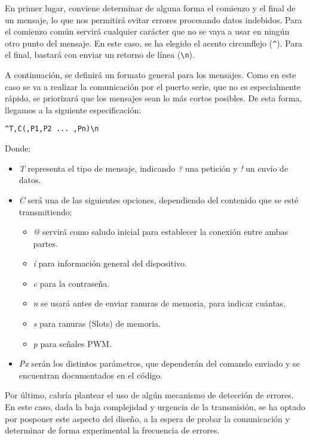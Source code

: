 En primer lugar, conviene determinar de alguna forma el comienzo y el final de un mensaje, lo que nos permitirá evitar errores procesando datos indebidos. Para el comienzo común servirá cualquier carácter que no se vaya a usar en ningún otro punto del mensaje. En este caso, se ha elegido el acento circunflejo (\verb|^|). Para el final, bastará con enviar un retorno de línea (\verb|\n|).

A continuación, se definirá un formato general para los mensajes. Como en este caso se va a realizar la comunicación por el puerto serie, que no es especialmente rápido, se priorizará que los mensajes sean lo más cortos posibles. De esta forma, llegamos a la siguiente especificación:

\begin{center}
    {\selectfont\verb|^T,C(,P1,P2 ... ,Pn)\n|}
\end{center}

Donde:

\begin{itemize}
    \item\textit{T} representa el tipo de mensaje, indicando \textit{?} una petición y \textit{!} un envío de datos.
    \item\textit{C} será una de las siguientes opciones, dependiendo del contenido que se esté transmitiendo:
        \begin{itemize}
            \item\textit{@} servirá como saludo inicial para establecer la conexión entre ambas partes.
            \item\textit{i} para información general del dispositivo.
            \item\textit{c} para la contraseña.
            \item\textit{n} se usará antes de enviar ranuras de memoria, para indicar cuántas.
            \item\textit{s} para ranuras (Slots) de memoria.
            \item\textit{p} para señales PWM.
        \end{itemize}
    \item\textit{Px} serán los distintos parámetros, que dependerán del comando enviado y se encuentran documentados en el código.
\end{itemize}

Por último, cabría plantear el uso de algún mecanismo de detección de errores. En este caso, dada la baja complejidad y urgencia de la transmisión, se ha optado por posponer este aspecto del diseño, a la espera de probar la comunicación y determinar de forma experimental la frecuencia de errores.

